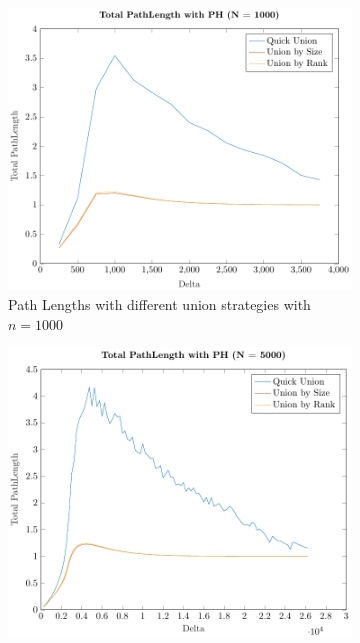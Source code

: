 \begin{figure}[ht]
    \centering
    \begin{subfigure}{0.32\textwidth}
        \centering
        \includegraphics[width=\textwidth]{../images/plotPHFull1000_PathLength.pdf}
        \caption{Path Lengths with different union strategies with $n = 1000$}
    \end{subfigure}%
    \hfill
    \begin{subfigure}{0.32\textwidth}
        \centering
        \includegraphics[width=\textwidth]{../images/plotPHFull5000_PathLength.pdf}

\end{subfigure}
\end{figure}
